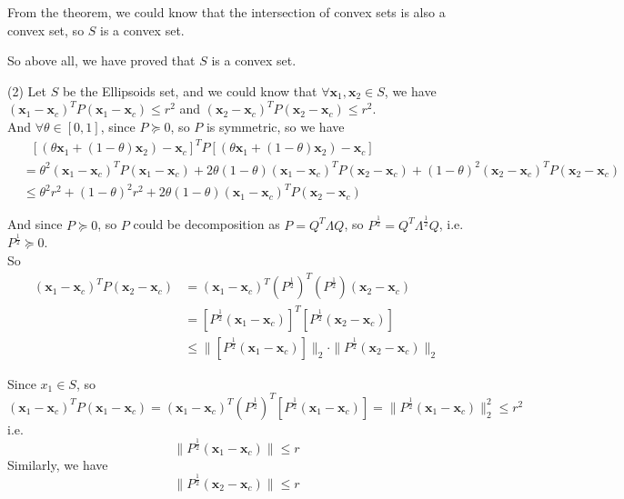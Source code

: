 \documentclass[10pt]{article}
\renewcommand{\mathbf}{\boldsymbol}
\begin{document}
\begin{enumerate}
From the theorem, we could know that the intersection of convex sets is also a convex set, so $S$ is a convex set.

So above all, we have proved that $S$ is a convex set.

(2) Let $S$ be the Ellipsoids set, and we could know that $\forall\mathbf{x}_1,\mathbf{x}_2\in S$, we have $(\mathbf{x}_1-\mathbf{x}_c)^TP(\mathbf{x}_1-\mathbf{x}_c)\leq r^2$ and $(\mathbf{x}_2-\mathbf{x}_c)^TP(\mathbf{x}_2-\mathbf{x}_c)\leq r^2$.\\
And $\forall\theta\in[0,1]$, since $P\succeq 0$, so $P$ is symmetric, so we have
\begin{align*}
    &\ \ \  [(\theta\mathbf{x}_1+(1-\theta)\mathbf{x}_2)-\mathbf{x}_c]^TP[(\theta\mathbf{x}_1+(1-\theta)\mathbf{x}_2)-\mathbf{x}_c] \\
    &= \theta^2(\mathbf{x}_1-\mathbf{x}_c)^TP(\mathbf{x}_1-\mathbf{x}_c)+2\theta(1-\theta)(\mathbf{x}_1-\mathbf{x}_c)^TP(\mathbf{x}_2-\mathbf{x}_c)+(1-\theta)^2(\mathbf{x}_2-\mathbf{x}_c)^TP(\mathbf{x}_2-\mathbf{x}_c)\\
    &\leq \theta^2r^2+(1-\theta)^2r^2+2\theta(1-\theta)(\mathbf{x}_1-\mathbf{x}_c)^TP(\mathbf{x}_2-\mathbf{x}_c)
\end{align*}

And since $P\succeq 0$, so $P$ could be decomposition as $P=Q^T\Lambda Q$, so $P^{\frac{1}{2}}=Q^T\Lambda^{\frac{1}{2}}Q$, i.e. $P^{\frac{1}{2}}\succeq 0$.\\
So
\begin{align*}
    (\mathbf{x}_1-\mathbf{x}_c)^TP(\mathbf{x}_2-\mathbf{x}_c) &= (\mathbf{x}_1-\mathbf{x}_c)^T(P^{\frac{1}{2}})^T(P^{\frac{1}{2}})(\mathbf{x}_2-\mathbf{x}_c)\\
    &= [P^{\frac{1}{2}}(\mathbf{x}_1-\mathbf{x}_c)]^T[P^{\frac{1}{2}}(\mathbf{x}_2-\mathbf{x}_c)]\\
    &\leq \|[P^{\frac{1}{2}}(\mathbf{x}_1-\mathbf{x}_c)]\|_2\cdot\|P^{\frac{1}{2}}(\mathbf{x}_2-\mathbf{x}_c)\|_2
\end{align*}

Since $x_1\in S$, so 
$$(\mathbf{x}_1-\mathbf{x}_c)^TP(\mathbf{x}_1-\mathbf{x}_c)=(\mathbf{x}_1-\mathbf{x}_c)^T(P^{\frac{1}{2}})^T[P^{\frac{1}{2}}(\mathbf{x}_1-\mathbf{x}_c)]=\|P^{\frac{1}{2}}(\mathbf{x}_1-\mathbf{x}_c)\|_2^2\leq r^2$$
i.e. $$\|P^{\frac{1}{2}}(\mathbf{x}_1-\mathbf{x}_c)\|\leq r$$
Similarly, we have  $$\|P^{\frac{1}{2}}(\mathbf{x}_2-\mathbf{x}_c)\|\leq r$$


\end{enumerate}
\end{document}
